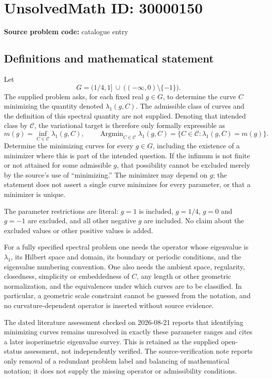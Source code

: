 \documentclass[11pt]{article}
\begin{document}
\section*{UnsolvedMath ID: 30000150}
\textbf{Source problem code:} catalogue entry
\subsection{Definitions and mathematical statement}
Let
\[
 G=(1/4,1]\ \cup\ \bigl(( -\infty,0)\setminus\{-1\}\bigr).
\]
The supplied problem asks, for each fixed real \(g\in G\), to determine the curve \(C\) minimizing the quantity denoted \(\lambda_1(g,C)\). The admissible class of curves and the definition of this spectral quantity are not supplied. Denoting that intended class by \(\mathcal C\), the variational target is therefore only formally expressible as
\[
 m(g)=\inf_{C\in\mathcal C}\lambda_1(g,C),\qquad
 \operatorname{Argmin}_{C\in\mathcal C}\lambda_1(g,C)
 =\{C\in\mathcal C:\lambda_1(g,C)=m(g)\}.
\]
Determine the minimizing curves for every \(g\in G\), including the existence of a minimizer where this is part of the intended question. If the infimum is not finite or not attained for some admissible \(g\), that possibility cannot be excluded merely by the source's use of ``minimizing.'' The minimizer may depend on \(g\); the statement does not assert a single curve minimizes for every parameter, or that a minimizer is unique.

The parameter restrictions are literal: \(g=1\) is included, \(g=1/4\), \(g=0\) and \(g=-1\) are excluded, and all other negative \(g\) are included. No claim about the excluded values or other positive values is added.

For a fully specified spectral problem one needs the operator whose eigenvalue is \(\lambda_1\), its Hilbert space and domain, its boundary or periodic conditions, and the eigenvalue numbering convention. One also needs the ambient space, regularity, closedness, simplicity or embeddedness of \(C\), any length or other geometric normalization, and the equivalences under which curves are to be classified. In particular, a geometric scale constraint cannot be guessed from the notation, and no curvature-dependent operator is inserted without source evidence.

The dated literature assessment checked on 2026-08-21 reports that identifying minimizing curves remains unresolved in exactly these parameter ranges and cites a later isoperimetric eigenvalue survey. This is retained as the supplied open-status assessment, not independently verified. The source-verification note reports only removal of a redundant problem label and balancing of mathematical notation; it does not supply the missing operator or admissibility conditions.
\end{document}
